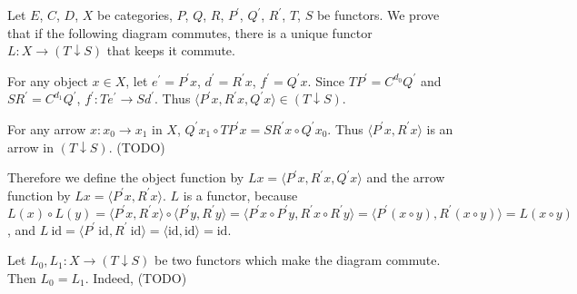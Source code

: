 \documentclass[luatex]{article}
\begin{document}
\showArt

Let $E$, $C$, $D$, $X$ be categories, $P$, $Q$, $R$, $P^\prime$, $Q^\prime$, $R^\prime$, $T$, $S$ be functors. We prove that if the following diagram commutes, there is a unique functor $L : X \rightarrow (T \downarrow S)$ that keeps it commute.

\begin{center}
\end{center}

For any object $x \in X$, let $e^\prime = P^\prime x$, $d^\prime = R^\prime x$, $f^\prime = Q^\prime x$. Since $TP^\prime = C^{d_0}Q^\prime$ and $SR^\prime = C^{d_1}Q^\prime$, $f^\prime : Te^\prime \rightarrow Sd^\prime$. Thus $\langle P^\prime x, R^\prime x, Q^\prime x \rangle \in (T \downarrow S)$.

For any arrow $x : x_0 \rightarrow x_1$ in $X$, $Q^\prime x_1 \circ TP^\prime x = SR^\prime x \circ Q^\prime x_0$. Thus $\langle P^\prime x, R^\prime x \rangle$ is an arrow in $(T \downarrow S)$. (TODO)

Therefore we define the object function by $Lx = \langle P^\prime x, R^\prime x, Q^\prime x \rangle$ and the arrow function by $Lx = \langle P^\prime x, R^\prime x \rangle$. $L$ is a functor, because $L(x) \circ L(y) = \langle P^\prime x, R^\prime x \rangle \circ \langle P^\prime y, R^\prime y \rangle = \langle P^\prime x \circ P^\prime y, R^\prime x \circ R^\prime y \rangle = \langle P^\prime (x \circ y), R^\prime (x \circ y) \rangle = L(x \circ y)$, and $L\ \mathrm{id} = \langle P^\prime\ \mathrm{id}, R^\prime\ \mathrm{id} \rangle = \langle \mathrm{id}, \mathrm{id} \rangle = \mathrm{id}$.

Let $L_0, L_1 : X \rightarrow (T \downarrow S)$ be two functors which make the diagram commute. Then $L_0 = L_1$. Indeed, (TODO)

\subsubsection{}
\end{document}
